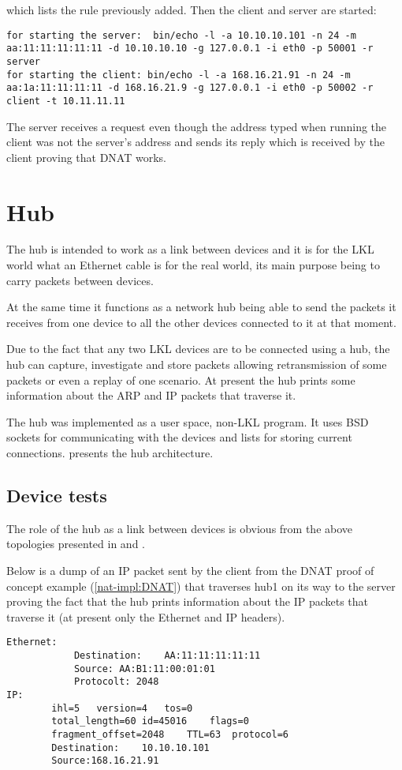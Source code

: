 {{\begin{itemize}
which lists the rule previously added. 
Then the client and server are started:
\lstset{language=TeX, caption=SNAT-starting client and server applications}
\begin{lstlisting}
for starting the server:  bin/echo -l -a 10.10.10.101 -n 24 -m aa:11:11:11:11:11 -d 10.10.10.10 -g 127.0.0.1 -i eth0 -p 50001 -r server
for starting the client: bin/echo -l -a 168.16.21.91 -n 24 -m aa:1a:11:11:11:11 -d 168.16.21.9 -g 127.0.0.1 -i eth0 -p 50002 -r client -t 10.11.11.11
\end{lstlisting}
 The server receives a request even though the address typed when running the client was not the server's address and sends its reply which is received by the client proving that DNAT works.
\end{itemize}
\section{Hub}
\label{sec:hub:impl}

The hub is intended to work as a link between devices and it is for the LKL world what an Ethernet 
cable is for the real world, its main purpose being to carry packets between devices.

At the same time it functions as a network hub being able to send the packets it receives from one 
device to all the other devices connected to it at that moment.

Due to the fact that any two LKL devices are to be connected using a hub, the hub can capture, 
investigate and store packets allowing retransmission of some packets or even a replay of one scenario. 
At present the hub prints some information about the ARP and IP packets that traverse it. 

The hub was implemented as a user space, non-LKL program. It uses BSD sockets for communicating with the 
devices and lists for storing current connections.
 presents the hub architecture. 
\subsection{Device tests}
\label{sub-sec:router-tests}
The role of the hub as a link between devices is obvious from the above topologies presented in 
 and .

Below is a dump of an IP packet sent by the client from the DNAT proof of concept example
(\ref{nat-impl:DNAT}) that traverses hub1 on its way to the server proving the fact that 
the hub prints information about the IP packets that traverse it (at present only the Ethernet and IP headers).
\pagebreak[4]
\lstset{language=TeX, caption=Hub-print packet information}
\begin{lstlisting}
Ethernet:
			Destination:	AA:11:11:11:11:11
			Source:	AA:B1:11:00:01:01
			Protocolt: 2048
IP:
		ihl=5	version=4	tos=0
		total_length=60	id=45016	flags=0
		fragment_offset=2048	TTL=63	protocol=6
		Destination:	10.10.10.101
		Source:168.16.21.91
\end{lstlisting}
 

}}
